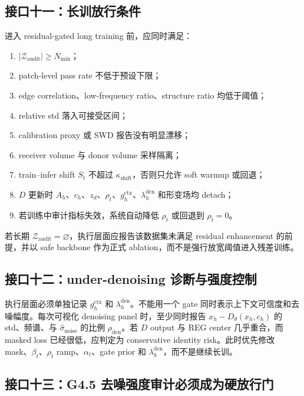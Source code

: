 \documentclass[11pt,a4paper,UTF8,fontset=fandol]{ctexart}
\theoremstyle{definition}
\newcommand{\cZ}{\mathcal{Z}}
\begin{document}
\subsection{接口十一：长训放行条件}

进入 residual-gated long training 前，应同时满足：
\begin{enumerate}
    \item $|\cZ_{\mathrm{audit}}|\ge N_{\min}$；
    \item patch-level pass rate 不低于预设下限；
    \item edge correlation、low-frequency ratio、structure ratio 均低于阈值；
    \item relative std 落入可接受区间；
    \item calibration proxy 或 SWD 报告没有明显漂移；
    \item receiver volume 与 donor volume 采样隔离；
    \item train--infer shift $S_t$ 不超过 $\kappa_{\mathrm{shift}}$，否则只允许 soft warmup 或回退；
    \item $D$ 更新时 $A_h$、$c_h$、$z_d$、$\rho_t$、$g_h^{\mathrm{ctx}}$、$\lambda_h^{\mathrm{den}}$ 和形变场均 detach；
    \item 若训练中审计指标失效，系统自动降低 $\rho_t$ 或回退到 $\rho_t=0$。
\end{enumerate}

若长期 $\cZ_{\mathrm{audit}}=\varnothing$，执行层面应报告该数据集未满足 residual enhancement 的前提，并以 safe backbone 作为正式 ablation，而不是强行放宽阈值进入残差训练。

\subsection{接口十二：under-denoising 诊断与强度控制}

执行层面必须单独记录 $g_h^{\mathrm{ctx}}$ 和 $\lambda_h^{\mathrm{den}}$。不能用一个 gate 同时表示上下文可信度和去噪幅度。每次可视化 denoising panel 时，至少同时报告 $x_h-D_\theta(x_h,c_h)$ 的 std、频谱、与 $\widehat\sigma_{\mathrm{noise}}$ 的比例 $\rho_{\mathrm{den}}$。若 $D$ output 与 REG center 几乎重合，而 masked loss 已经很低，应判定为 conservative identity risk。此时优先修改 mask、$\beta_t$、$\rho_t$ ramp、$\alpha_t$、gate prior 和 $\lambda_h^{\mathrm{den}}$，而不是继续长训。




\subsection{接口十三：G4.5 去噪强度审计必须成为硬放行门}
\end{document}
